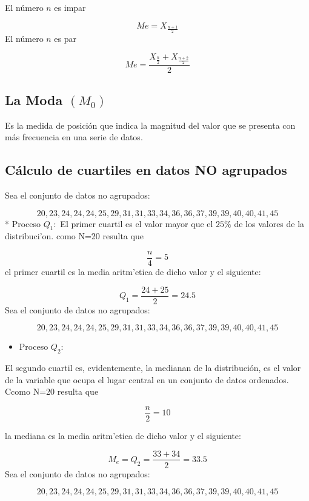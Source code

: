 \documentclass[
]{book}
\providecommand{\tightlist}{%
  \setlength{\itemsep}{0pt}\setlength{\parskip}{0pt}}
\theoremstyle{definition}
\theoremstyle{definition}
\theoremstyle{definition}
\theoremstyle{definition}
\theoremstyle{remark}
\begin{document}
El número \(n\) es impar

\[Me=X_{\frac{n+1}{2}}\]
El número \(n\) es par

\[Me=\dfrac{X_{\frac{n}{2}}+X_{\frac{n+2}{2}}}{2}\]

\hypertarget{la-moda-m_0}{%
\subsection{\texorpdfstring{La Moda \((M_{0})\)}{La Moda (M\_\{0\})}}\label{la-moda-m_0}}

Es la medida de posición que indica la magnitud del valor que se presenta con más frecuencia en una serie de datos.

\hypertarget{cuxe1lculo-de-cuartiles-en-datos-no-agrupados}{%
\subsection{Cálculo de cuartiles en datos NO agrupados}\label{cuxe1lculo-de-cuartiles-en-datos-no-agrupados}}

Sea el conjunto de datos no agrupados:

\[
    20,23,24,24,24,25,29,31,31,33,34,36,36,37,39,39,40,40,41,45
\]
* Proceso \(Q_{1}:\)
El primer cuartil es el valor mayor que el \(25 \%\) de los valores de la distribuci'on. como N=20 resulta que

\[
\dfrac{n}{4}=5
\]
el primer cuartil es la media aritm'etica de dicho valor y el siguiente:

\[
Q_{1}=\dfrac{24+25}{2}=24.5
\]
Sea el conjunto de datos no agrupados:

\[
    20,23,24,24,24,25,29,31,31,33,34,36,36,37,39,39,40,40,41,45
\]

\begin{itemize}
\tightlist
\item
  Proceso \(Q_{2}:\)
\end{itemize}

El segundo cuartil es, evidentemente, la medianan de la distribución, es el valor de la variable que ocupa el lugar central en un conjunto de datos ordenados. Ccomo N=20 resulta que

\[
\dfrac{n}{2}=10
\]

la mediana es la media aritm'etica de dicho valor y el siguiente:

\[
M_{e}=Q_{2}=\dfrac{33+34}{2}=33.5
\]
Sea el conjunto de datos no agrupados:

\[
    20,23,24,24,24,25,29,31,31,33,34,36,36,37,39,39,40,40,41,45
\]
\end{document}
